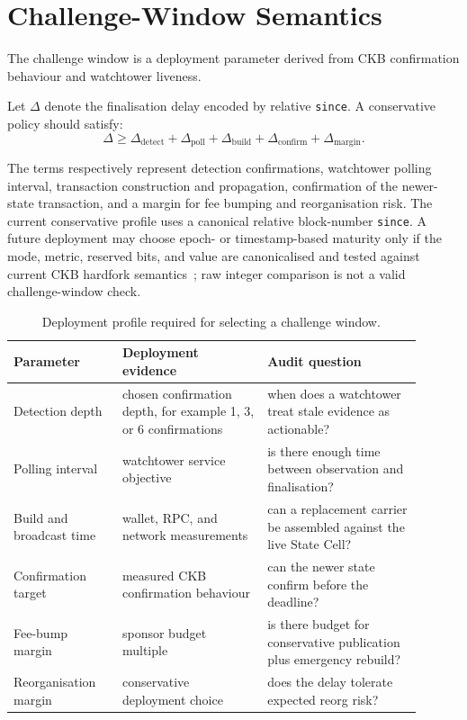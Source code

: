\documentclass[a4paper,11pt]{article}
\begin{document}
\clearpage
\section{Challenge-Window Semantics}

The challenge window is a deployment parameter derived from CKB confirmation behaviour and watchtower liveness.

Let $\Delta$ denote the finalisation delay encoded by relative \texttt{since}. A conservative policy should satisfy:
\[
\Delta \ge
\Delta_{\mathrm{detect}}+
\Delta_{\mathrm{poll}}+
\Delta_{\mathrm{build}}+
\Delta_{\mathrm{confirm}}+
\Delta_{\mathrm{margin}}.
\]

The terms respectively represent detection confirmations, watchtower polling interval, transaction construction and propagation, confirmation of the newer-state transaction, and a margin for fee bumping and reorganisation risk. The current conservative profile uses a canonical relative block-number \texttt{since}. A future deployment may choose epoch- or timestamp-based maturity only if the mode, metric, reserved bits, and value are canonicalised and tested against current CKB hardfork semantics~\cite{ckb-since,ckb-since-timestamp,ckb-since-epoch}; raw integer comparison is not a valid challenge-window check.

\begin{table}[htbp]
\centering
\small
\setlength{\tabcolsep}{4pt}
\begin{tabular}{L{0.24\linewidth}L{0.32\linewidth}L{0.34\linewidth}}
\toprule
Parameter & Deployment evidence & Audit question \\
\midrule
Detection depth & chosen confirmation depth, for example 1, 3, or 6 confirmations & when does a watchtower treat stale evidence as actionable? \\
Polling interval & watchtower service objective & is there enough time between observation and finalisation? \\
Build and broadcast time & wallet, RPC, and network measurements & can a replacement carrier be assembled against the live State Cell? \\
Confirmation target & measured CKB confirmation behaviour & can the newer state confirm before the deadline? \\
Fee-bump margin & sponsor budget multiple & is there budget for conservative publication plus emergency rebuild? \\
Reorganisation margin & conservative deployment choice & does the delay tolerate expected reorg risk? \\
\bottomrule
\end{tabular}
\caption{Deployment profile required for selecting a challenge window.}
\label{tab:challenge-profile}
\end{table}
\end{document}
